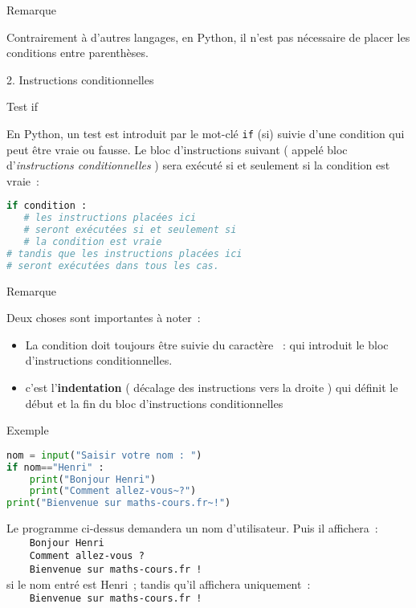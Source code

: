 \begin{h3}Remarque\end{h3}
Contrairement à d'autres langages, en Python, il n'est pas nécessaire de placer les conditions entre parenthèses.
\begin{h2}2. Instructions conditionnelles\end{h2}
\begin{h3} Test \og if \fg{}\end{h3}
En Python, un test est introduit par le mot-clé \og \texttt{if} \fg{} (si) suivie d'une condition qui peut être vraie ou fausse. Le bloc d'instructions suivant ( appelé bloc d'\textit{instructions conditionnelles} ) sera exécuté si et seulement si la condition est vraie~:
\begin{lstlisting}[language=Python]
if condition :
   # les instructions placées ici
   # seront exécutées si et seulement si 
   # la condition est vraie 
# tandis que les instructions placées ici
# seront exécutées dans tous les cas.
\end{lstlisting}
\begin{h3}Remarque\end{h3}
Deux choses sont importantes à noter~:
\begin{itemize}
     \item
     La condition doit toujours être suivie du caractère \og~: \fg{} qui introduit le bloc d'instructions conditionnelles.
     \item
     c'est l'\textbf{indentation} ( décalage des instructions vers la droite ) qui définit le début et la fin du bloc d'instructions conditionnelles
\end{itemize}
\begin{h3}Exemple \end{h3}
\begin{lstlisting}[language=Python]
nom = input("Saisir votre nom : ")
if nom=="Henri" :
    print("Bonjour Henri")
    print("Comment allez-vous~?")
print("Bienvenue sur maths-cours.fr~!")
\end{lstlisting}
Le programme ci-dessus demandera un nom d'utilisateur.
\newpar
Puis il affichera~:\\
\texttt{    Bonjour Henri\\
         Comment allez-vous~?\\
    Bienvenue sur maths-cours.fr~!\\}
si le nom entré est Henri~;
\newpar
tandis qu'il affichera uniquement~:\\
\texttt{    Bienvenue sur maths-cours.fr~!\\}
